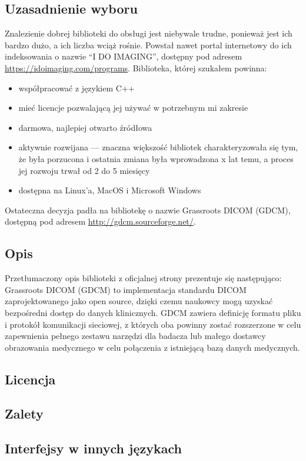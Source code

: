

\subsection{Uzasadnienie wyboru}

\par
Znalezienie dobrej biblioteki do obsługi jest niebywale trudne, ponieważ jest ich bardzo dużo, a ich liczba wciąż rośnie.
Powstał nawet portal internetowy do ich indeksowania o nazwie \enquote{I DO IMAGING}, dostępny pod adresem \url{https://idoimaging.com/programs}.
Biblioteka, której szukałem powinna:
\begin{itemize}
    \item współpracować z językiem C++
    \item mieć licencje pozwalającą jej używać w potrzebnym mi zakresie
    \item darmowa, najlepiej otwarto źródłowa
    \item aktywnie rozwijana --- znaczna większość bibliotek charakteryzowała się tym, że była porzucona i ostatnia zmiana była wprowadzona x lat temu, a proces jej rozwoju trwał od 2 do 5 miesięcy
    \item dostępna na Linux'a, MacOS i Microsoft Windows
\end{itemize}
Ostateczna decyzja padła na bibliotekę o nazwie Grassroots DICOM (GDCM), dostępną pod adresem \url{http://gdcm.sourceforge.net/}.

\subsection{Opis}

\par
Przetłumaczony opis biblioteki z oficjalnej strony prezentuje się następująco:
Grassroots DICOM (GDCM) to implementacja standardu DICOM zaprojektowanego jako open source, dzięki czemu naukowcy mogą uzyskać bezpośredni dostęp do danych klinicznych.
GDCM zawiera definicję formatu pliku i protokół komunikacji sieciowej, z których oba powinny zostać rozszerzone w celu zapewnienia pełnego zestawu narzędzi dla badacza lub małego dostawcy obrazowania medycznego w celu połączenia z istniejącą bazą danych medycznych.

\par


\subsection{Licencja}
\subsection{Zalety}
\subsection{Interfejsy w innych językach}